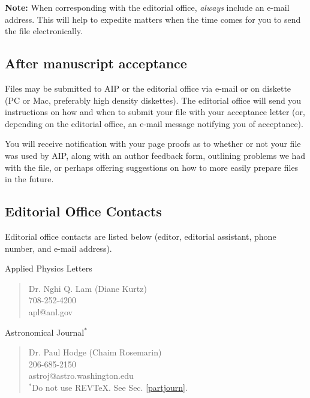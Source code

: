 {\bf Note:} When corresponding with the editorial office, {\it always}
include an e-mail address. This will help to expedite matters when
the time comes for you to send the file electronically.






\subsection{After manuscript acceptance}

Files may be submitted to AIP or the editorial office via e-mail
or on diskette (PC or Mac, preferably high density diskettes). The
editorial office will send you instructions on how and when to
submit your file with your acceptance letter (or, depending on the
editorial office, an e-mail message notifying you of acceptance).

You will receive notification with your page proofs as to whether
or not your file was used by AIP, along with an author feedback
form, outlining problems we had with the file, or perhaps offering
suggestions on how to more easily prepare files in the future.



\subsection{Editorial Office Contacts}
\label{contacts}

Editorial office contacts are listed below (editor, editorial
assistant, phone number,  and e-mail address).


\bigskip

\noindent       Applied Physics Letters

\begin{verse}
                Dr. Nghi Q. Lam (Diane Kurtz)\\
                708-252-4200\\
                apl@anl.gov
 \end{verse}


\noindent      Astronomical Journal$^*$

\begin{verse}
             Dr. Paul Hodge (Chaim Rosemarin)\\
             206-685-2150\\
             astroj@astro.washington.edu\\
             $^*$Do not use REV\TeX .  See Sec. \ref{partjourn}.
\end{verse}

